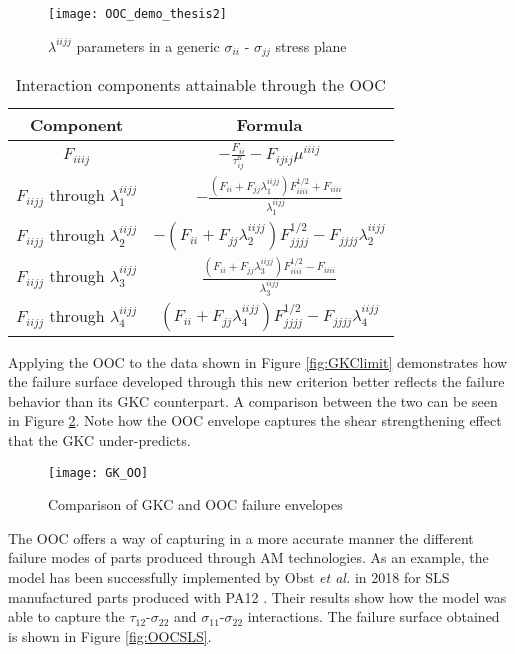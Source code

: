 \documentclass[main.tex]{subfiles}
\begin{document}
\pagebreak
\begin{figure}[h]
	\center
	\texttt{[image: OOC\_demo\_thesis2]}
	\caption{$\lambda^{iijj}$ parameters in a generic $\sigma_{ii}$ - $\sigma_{jj}$ stress plane} \label{fig:OOCdemo2}
\end{figure}
\begin{table}[!htbp] %
	\renewcommand{\arraystretch}{1.5}
	\centering
	\caption{Interaction components attainable through the OOC}
	\begin{tabular}{ c c } 
		\toprule
		\textbf{Component} & \textbf{Formula} \\
		\midrule
		$F_{iiij}$ & $-\frac{F_{ii}}{\tau_{ij}^u}-F_{ijij}\mu^{iiij}$\\
		$F_{iijj}$ through $\lambda^{iijj}_1$ & $-\frac{(F_{ii}+F_{jj}\lambda^{iijj}_1)F_{iiii}^{1/2}+F_{iiii}}{\lambda^{iijj}_1}$\\
		$F_{iijj}$ through $\lambda^{iijj}_2$ & $-(F_{ii}+F_{jj}\lambda^{iijj}_2)F_{jjjj}^{1/2}-F_{jjjj}\lambda^{iijj}_2$\\
		$F_{iijj}$ through $\lambda^{iijj}_3$ & $\frac{(F_{ii}+F_{jj}\lambda^{iijj}_3)F_{iiii}^{1/2}-F_{iiii}}{\lambda^{iijj}_3}$\\
		$F_{iijj}$ through $\lambda^{iijj}_4$ & $(F_{ii}+F_{jj}\lambda^{iijj}_4)F_{jjjj}^{1/2}-F_{jjjj}\lambda^{iijj}_4$\\
		\bottomrule
	\end{tabular}
	\label{tab:OOCcomp}
\end{table}

Applying the OOC to the data shown in Figure \ref{fig:GKClimit} demonstrates how the failure surface developed through this new criterion better reflects the failure behavior than its GKC counterpart. A comparison between the two can be seen in Figure \ref{fig:GKOOComp}. Note how the OOC envelope captures the shear strengthening effect that the GKC under-predicts. 
\begin{figure}[h]
	\center
	\texttt{[image: GK\_OO]}
	\caption{Comparison of GKC and OOC failure envelopes \cite{Osswald2017a}} \label{fig:GKOOComp}
\end{figure}

The OOC offers a way of capturing in a more accurate manner the different failure modes of parts produced through AM technologies. As an example, the model has been successfully implemented by Obst \emph{et al.} in 2018 for SLS manufactured parts produced with PA12 \cite{Obst2018, Obst2017}. Their results show how the model was able to capture the $\tau_{12}$-$\sigma_{22}$ and $\sigma_{11}$-$\sigma_{22}$ interactions. The failure surface obtained is shown in Figure \ref{fig:OOCSLS}.
\end{document}
